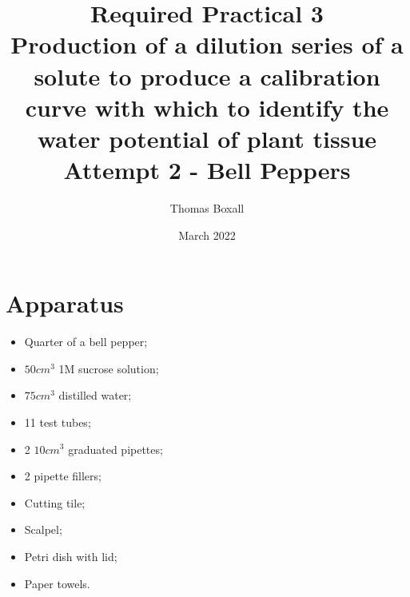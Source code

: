 \documentclass{thomasClass}
\title{\textbf{Required Practical 3}
\\Production of a dilution series of a solute to produce a calibration curve with which to identify the water potential of plant tissue\\
{\Large Attempt 2 - Bell Peppers}
}
\author{Thomas Boxall}
\date{March 2022}
\begin{document}
\maketitle

\section{Apparatus}
\begin{itemize}
    \item Quarter of a bell pepper;
    \item $50cm^3$ 1M sucrose solution;
    \item $75cm^3$ distilled water;
    \item 11 test tubes;
    \item 2 $10cm^3$ graduated pipettes;
    \item 2 pipette fillers;
    \item Cutting tile;
    \item Scalpel;
    \item Petri dish with lid;
    \item Paper towels.
\end{itemize}
\end{document}
